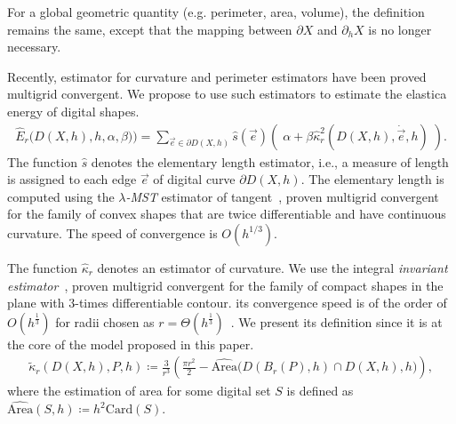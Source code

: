 \documentclass[review]{siamart220329}
\begin{document}
For a global geometric quantity (e.g. perimeter, area, volume), the definition remains the same, except that the mapping
between $\partial X$ and $\partial_h X$ is no longer necessary.

Recently, estimator for curvature and perimeter estimators have been proved multigrid convergent. We propose to use such estimators to estimate the elastica energy of digital shapes. 
%
%
\begin{align}
	\hat{E}_r\big( D(X,h),h,\alpha,\beta) \big) = \sum_{\vec{e} \in \partial D(X,h)}{ \hat{s}(\vec{e})\left(\; \alpha + \beta \hat{\kappa}_{r}^2(D(X,h),\dot{\vec{e}},h) \; \right)}.
	\label{eq:digital-energy}
\end{align}
%
%
The function $\hat{s}$ denotes the elementary length estimator, i.e., a measure of length is assigned to each edge $\vec{e}$ of digital curve $\partial D(X,h)$. The elementary length is computed using the \emph{$\lambda$-MST} estimator of tangent~\cite{lachaud07tangent,lachaud06hdr}, proven multigrid convergent for the family of convex shapes that are twice differentiable and have continuous curvature. The speed of convergence is $O(h^{1/3})$. 

The function $\hat{\kappa} _r$ denotes an estimator of curvature. We use the integral \emph{invariant estimator}~\cite{coeurjolly13integral}, proven multigrid convergent for the family of compact shapes in the plane with $3$-times differentiable contour.  its convergence speed is of the order of $O(h^{\frac{1}{3}})$ for radii chosen as $r=\Theta (h^{\frac{1}{3}})$~\cite{lachaud2017robust}. We present its definition since it is at the core of the model proposed in this paper.
%
%
\begin{align}
  \tilde{\kappa}_r(D(X,h),P,h) \coloneqq \frac{3}{r^3}\left( \frac{\pi r^2}{2} - \widehat{\text{Area}}\big( D(B_r(P),h) \cap D(X,h),h\big) \right),
  \label{eq:curvature_approximation}
\end{align}
%
%
where the estimation of area for some digital set $S$ is defined as $\widehat{\text{Area}}(S,h) \coloneqq h^2\text{Card}\left( S \right).$ 
\end{document}
